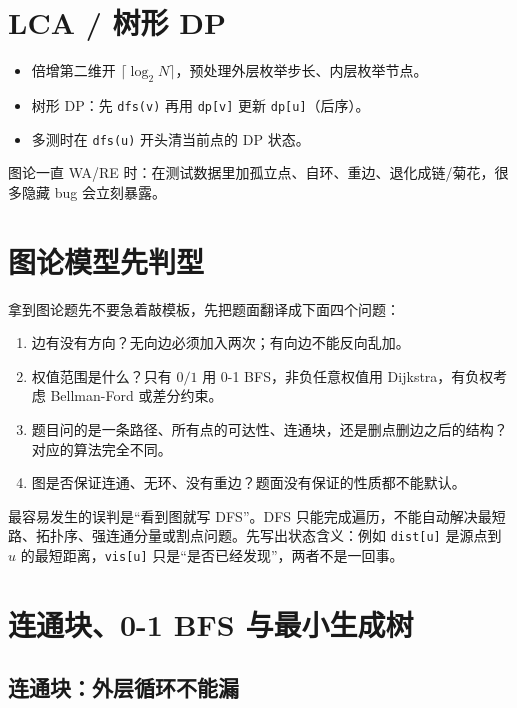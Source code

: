 \documentclass[UTF8,openany,oneside,zihao=-4]{ctexbook}
\begin{document}
\section{LCA / 树形 DP}

\begin{itemize}
  \item 倍增第二维开 $\lceil\log_2 N\rceil$，预处理外层枚举步长、内层枚举节点。
  \item 树形 DP：先 \lstinline|dfs(v)| 再用 \lstinline|dp[v]| 更新 \lstinline|dp[u]|（后序）。
  \item 多测时在 \lstinline|dfs(u)| 开头清当前点的 DP 状态。
\end{itemize}

\begin{tip}
图论一直 WA/RE 时：在测试数据里加孤立点、自环、重边、退化成链/菊花，很多隐藏 bug 会立刻暴露。
\end{tip}

\section{图论模型先判型}

拿到图论题先不要急着敲模板，先把题面翻译成下面四个问题：

\begin{enumerate}
  \item 边有没有方向？无向边必须加入两次；有向边不能反向乱加。
  \item 权值范围是什么？只有 $0/1$ 用 0-1 BFS，非负任意权值用 Dijkstra，有负权考虑 Bellman-Ford 或差分约束。
  \item 题目问的是一条路径、所有点的可达性、连通块，还是删点删边之后的结构？对应的算法完全不同。
  \item 图是否保证连通、无环、没有重边？题面没有保证的性质都不能默认。
\end{enumerate}

\begin{note}
 最容易发生的误判是“看到图就写 DFS”。DFS 只能完成遍历，不能自动解决最短路、拓扑序、强连通分量或割点问题。先写出状态含义：例如 \lstinline|dist[u]| 是源点到 $u$ 的最短距离，\lstinline|vis[u]| 只是“是否已经发现”，两者不是一回事。
\end{note}

\section{连通块、0-1 BFS 与最小生成树}

\subsection{连通块：外层循环不能漏}
\end{document}
